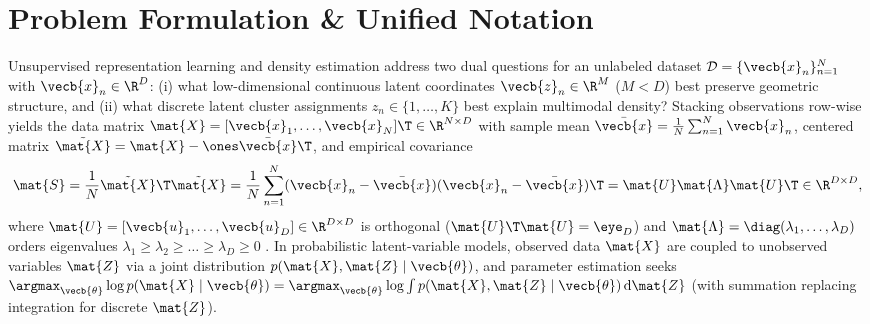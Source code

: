 \documentclass[../../../../master.tex]{subfiles}
\begin{document}

\section{Problem Formulation \& Unified Notation}
\label{sec:em:formulation}

Unsupervised representation learning and density estimation address two dual questions for an unlabeled dataset $\mathcal{D} = \{\vecb{x}_n\}_{n=1}^N$ with $\vecb{x}_n \in \R^D$: (i) what low-dimensional continuous latent coordinates $\vecb{z}_n \in \R^M$ ($M < D$) best preserve geometric structure, and (ii) what discrete latent cluster assignments $z_n \in \{1,\dots,K\}$ best explain multimodal density? Stacking observations row-wise yields the data matrix $\mat{X} = [\vecb{x}_1, \dots, \vecb{x}_N]\T \in \R^{N \times D}$ with sample mean $\bar{\vecb{x}} = \frac{1}{N}\sum_{n=1}^N \vecb{x}_n$, centered matrix $\tilde{\mat{X}} = \mat{X} - \ones \bar{\vecb{x}}\T$, and empirical covariance
\begin{equation}
  \mat{S} = \frac{1}{N}\tilde{\mat{X}}\T\tilde{\mat{X}} = \frac{1}{N}\sum_{n=1}^N (\vecb{x}_n - \bar{\vecb{x}})(\vecb{x}_n - \bar{\vecb{x}})\T = \mat{U}\mat{\Lambda}\mat{U}\T \in \R^{D \times D},
  \label{eq:em:sample_cov}
\end{equation}
where $\mat{U} = [\vecb{u}_1, \dots, \vecb{u}_D] \in \R^{D \times D}$ is orthogonal ($\mat{U}\T\mat{U} = \eye_D$) and $\mat{\Lambda} = \diag(\lambda_1, \dots, \lambda_D)$ orders eigenvalues $\lambda_1 \ge \lambda_2 \ge \dots \ge \lambda_D \ge 0$ . In probabilistic latent-variable models, observed data $\mat{X}$ are coupled to unobserved variables $\mat{Z}$ via a joint distribution $p(\mat{X}, \mat{Z} \mid \vecb{\theta})$, and parameter estimation seeks $\argmax_{\vecb{\theta}} \log p(\mat{X} \mid \vecb{\theta}) = \argmax_{\vecb{\theta}} \log \int p(\mat{X}, \mat{Z} \mid \vecb{\theta})\,\mathrm{d}\mat{Z}$ (with summation replacing integration for discrete $\mat{Z}$).
\end{document}
